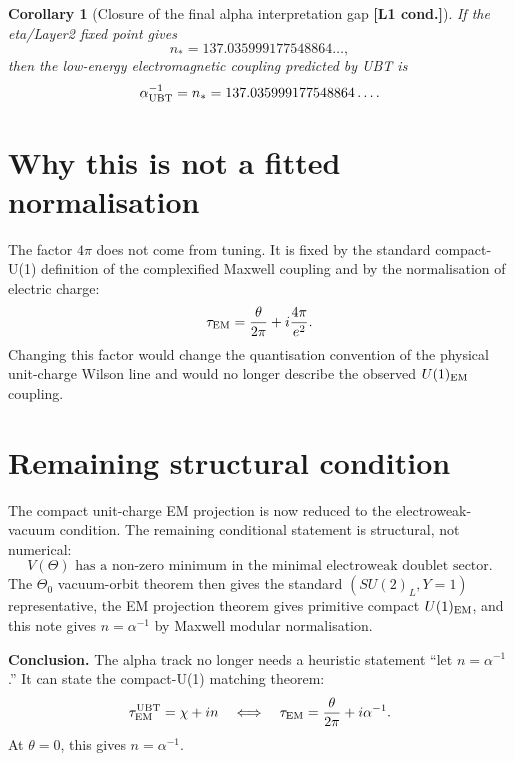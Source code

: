 \documentclass[12pt,a4paper]{article}
\newtheorem{corollary}[definition]{Corollary}
\newcommand{\Lone}{\textbf{[L1 cond.]}}
\begin{document}
\begin{corollary}[Closure of the final alpha interpretation gap \Lone]
If the eta/Layer2 fixed point gives
\[
  n_*=137.035999177548864\ldots,
\]
then the low-energy electromagnetic coupling predicted by UBT is
\[
  \alpha^{-1}_{\rm UBT}=n_*=137.035999177548864\ldots .
\]
\end{corollary}

\section{Why this is not a fitted normalisation}

The factor \(4\pi\) does not come from tuning.  It is fixed by the standard
compact-U(1) definition of the complexified Maxwell coupling and by the
normalisation of electric charge:
\[
  \tau_{\rm EM}=\frac{\theta}{2\pi}+i\frac{4\pi}{e^2}.
\]
Changing this factor would change the quantisation convention of the physical
unit-charge Wilson line and would no longer describe the observed
\(U(1)_{\rm EM}\) coupling.

\section{Remaining structural condition}

The compact unit-charge EM projection is now reduced to the electroweak-vacuum
condition.  The remaining conditional statement is structural, not numerical:
\[
  \boxed{
  V(\Theta)\text{ has a non-zero minimum in the minimal electroweak doublet sector.}
  }
\]
The \(\Theta_0\) vacuum-orbit theorem then gives the standard
\((SU(2)_L,Y=1)\) representative, the EM projection theorem gives primitive
compact \(U(1)_{\rm EM}\), and this note gives \(n=\alpha^{-1}\) by Maxwell
modular normalisation.

\begin{resultbox}
\textbf{Conclusion.} The alpha track no longer needs a heuristic statement
``let \(n=\alpha^{-1}\).''  It can state the compact-U(1) matching theorem:
\[
  \tau^{\rm UBT}_{\rm EM}=\chi+i n
  \quad\Longleftrightarrow\quad
  \tau_{\rm EM}=\frac{\theta}{2\pi}+i\alpha^{-1}.
\]
At \(\theta=0\), this gives \(n=\alpha^{-1}\).
\end{resultbox}

\ifdefined\INCLUDEMODE\else
\end{document}
